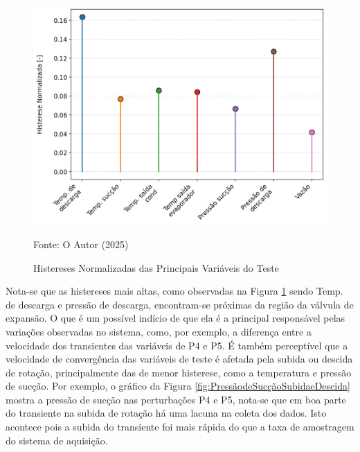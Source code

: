  \begin{figure}[h] 

    \centering
    \includegraphics[width=1\linewidth]{FigurasdoTexto/Histereses Normalizadas.png}
    \caption{Histereses Normalizadas das Principais Variáveis do Teste}
    \label{fig:histereses normalizadas}
    {\footnotesize Fonte: O Autor (2025)}
\end{figure}

Nota-se que as histereses mais altas, como observadas na Figura \ref{fig:histereses normalizadas} sendo Temp. de descarga e pressão de descarga, encontram-se próximas da região da válvula de expansão. O que é um possível indício de que ela é a principal responsável pelas variações observadas no sistema, como, por exemplo, a diferença entre a velocidade dos transientes das variáveis de P4 e P5. É também perceptível que a velocidade de convergência das variáveis de teste é afetada pela subida ou descida de rotação, principalmente das de menor histerese, como a temperatura e pressão de sucção. Por exemplo, o gráfico da Figura \ref{fig:PressãodeSucçãoSubidaeDescida} mostra a pressão de sucção nas perturbações P4 e P5, nota-se que em boa parte do transiente na subida de rotação há uma lacuna na coleta dos dados. Isto acontece pois a subida do transiente foi mais rápida do que a taxa de amostragem do sistema de aquisição.

